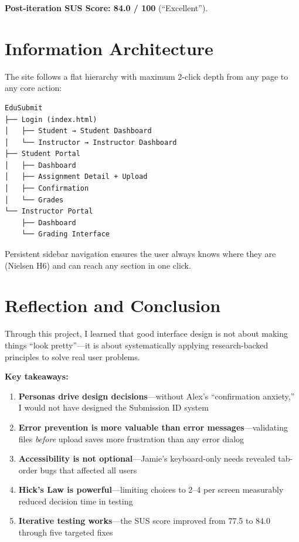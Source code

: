 \documentclass[12pt, a4paper]{article}
\begin{document}
\textbf{Post-iteration SUS Score: 84.0 / 100} (``Excellent'').

\section{Information Architecture}

The site follows a flat hierarchy with maximum 2-click depth from any page to any core action:

\begin{verbatim}
EduSubmit
├── Login (index.html)
│   ├── Student → Student Dashboard
│   └── Instructor → Instructor Dashboard
├── Student Portal
│   ├── Dashboard
│   ├── Assignment Detail + Upload
│   ├── Confirmation
│   └── Grades
└── Instructor Portal
    ├── Dashboard
    └── Grading Interface
\end{verbatim}

Persistent sidebar navigation ensures the user always knows where they are (Nielsen H6) and can reach any section in one click.

\section{Reflection and Conclusion}

Through this project, I learned that good interface design is not about making things ``look pretty''—it is about systematically applying research-backed principles to solve real user problems.

\textbf{Key takeaways:}
\begin{enumerate}[noitemsep]
  \item \textbf{Personas drive design decisions}—without Alex's ``confirmation anxiety,'' I would not have designed the Submission ID system
  \item \textbf{Error prevention is more valuable than error messages}—validating files \textit{before} upload saves more frustration than any error dialog
  \item \textbf{Accessibility is not optional}—Jamie's keyboard-only needs revealed tab-order bugs that affected all users
  \item \textbf{Hick's Law is powerful}—limiting choices to 2–4 per screen measurably reduced decision time in testing
  \item \textbf{Iterative testing works}—the SUS score improved from 77.5 to 84.0 through five targeted fixes
\end{enumerate}
\end{document}
